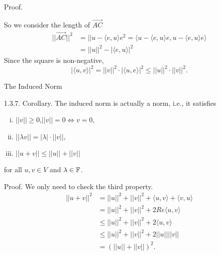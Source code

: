 \documentclass[hyperref={pdfpagelabels=true}]{beamer}
\newcommand{\<}{\langle}
\renewcommand{\>}{\rangle}
\begin{document}
\begin{frame}
    \begin{block}{Proof.}
    So we consider the length of $\overrightarrow{AC}$
    \[
        \begin{aligned}
            ||\overrightarrow{AC}||^{2} &= ||u-\<e,u\>e^{2} = \<u-\<e,u\>e,u-\<e,u\>e\>\\
                                        &= ||u||^{2}-|\<e,u\>|^{2}
        \end{aligned}
    \]
    Since the square is non-negative,
    \[|\<u,v\>|^{2} = ||v||^{2}\cdot |\<u,e\>|^{2} \leq ||u||^{2} \cdot ||v||^{2}.\]
    \end{block}
\end{frame}
\begin{frame}{The Induced Norm}
    \begin{block}{1.3.7. Corollary.}
        The induced norm is actually a norm, i.e., it satisfies 
        \begin{enumerate}[(i)]
            \item $||v|| \geq 0$,$||v|| = 0 \Leftrightarrow v = 0,$
            \item $||\lambda v|| = |\lambda|\cdot||v||,$
            \item $||u+v|| \leq ||u||+||v||$
        \end{enumerate}
        for all $u,v \in V$ and $\lambda \in \mathbb{F}$.
    \end{block}
    \begin{block}{Proof.}
        We only need to check the third property.
        \[
            \begin{aligned}
                ||u+v||^{2} &= ||u||^{2}+||v||^{2}+\<u,v\>+\<v,u\>\\
                &= ||u||^{2}+||v||^{2}+2Re\<u,v\>\\
                &\leq ||u||^{2}+||v||^{2}+2\<u,v\>\\
                &\leq ||u||^{2}+||v||^{2}+2||u||||v||\\
                &= (||u||+||v||)^{2}.
            \end{aligned}
        \]
    \end{block}
\end{frame}
\end{document}
